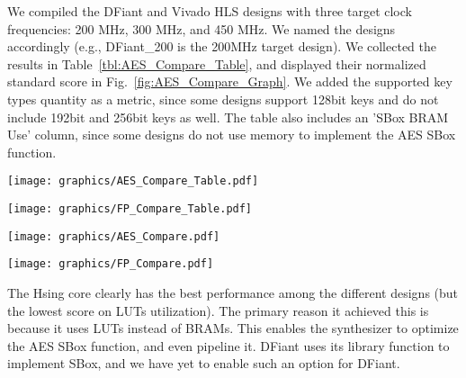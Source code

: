 We compiled the DFiant and Vivado HLS designs with three target clock frequencies: 200 MHz, 300 MHz, and 450 MHz. We named the designs accordingly (e.g., DFiant\_200 is the 200MHz target design). We collected the results in Table~\ref{tbl:AES_Compare_Table}, and displayed their normalized standard score in Fig.~\ref{fig:AES_Compare_Graph}. We added the supported key types quantity as a metric, since some designs support 128bit keys and do not include 192bit and 256bit keys as well. The table also includes an 'SBox BRAM Use' column, since some designs do not use memory to implement the AES SBox function.

\begin{table*}[t!]
  \centering
  \begin{minipage}[t][5cm][t]{0.62\linewidth}
    \centering
    \label{tbl:AES_Compare_Table}
    \texttt{[image: graphics/AES\_Compare\_Table.pdf]} 
  \end{minipage}
  \hfill
  \begin{minipage}[t][5cm][t]{0.37\linewidth}
    \centering
    \label{tbl:FP_Compare_Table}
    \texttt{[image: graphics/FP\_Compare\_Table.pdf]} 
  \end{minipage}
  \begin{minipage}[b][3.8cm][b]{0.62\linewidth}
  	\centering
    \texttt{[image: graphics/AES\_Compare.pdf]} 
    \label{fig:AES_Compare_Graph}
  \end{minipage}
  \hfill
  \begin{minipage}[b][3.8cm][b]{0.37\linewidth}
    \centering
    \texttt{[image: graphics/FP\_Compare.pdf]} 
    \label{fig:FP_Compare_Graph}
  \end{minipage}
\end{table*}

The Hsing core clearly has the best performance among the different designs (but the lowest score on LUTs utilization). The primary reason it achieved this is because it uses LUTs instead of BRAMs. This enables the synthesizer to optimize the AES SBox function, and even pipeline it. DFiant uses its  library function to implement SBox, and we have yet to enable such an option for DFiant. 

